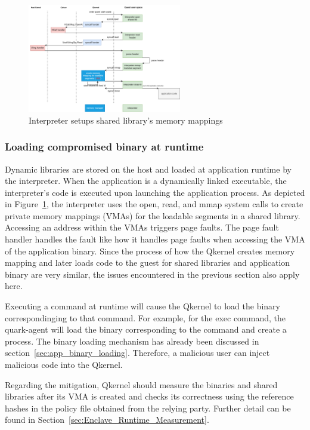 \begin{figure}[htp]
  \centering
  \includegraphics[width=0.6\textwidth]{images/load_shared_libarart.png}
  \caption[Interpreter setups shared library's memory mappings]{Interpreter setups shared library's memory mappings}
  \label{fig:load_shared_libarart}
\end{figure}


\subsubsection{Loading compromised binary at runtime}
Dynamic libraries are stored on the host and loaded at application runtime by the interpreter. When the application is a dynamically linked executable, the interpreter's code is executed upon launching the application process. As depicted in Figure~\ref{fig:load_shared_libarart}, the interpreter uses the open, read, and mmap 
system calls to create private memory mappings (VMAs) for the loadable segments in a shared library. Accessing an address within the VMAs triggers page faults. The page fault handler handles the fault like how it handles page faults when accessing the VMA of the application binary.
Since the process of how the Qkernel creates memory mapping and later loads code to the guest for shared libraries and application binary are very similar, the issues encountered in the previous section also apply here. 
 
Executing a command at runtime will cause the Qkernel to load the binary correspondinging to that command. For example, for the exec command, the quark-agent will load the binary corresponding to the command and create a process. The binary loading mechanism has already been discussed in section~\ref{sec:app_binary_loading}. Therefore, a malicious user can inject malicious code into the Qkernel. 
 
Regarding the mitigation, Qkernel should measure the binaries and shared libraries after its VMA is created and checks its correctness using the reference hashes in the policy file obtained from the relying party. Further detail can be found in Section~\ref{sec:Enclave_Runtime_Measurement}. 


